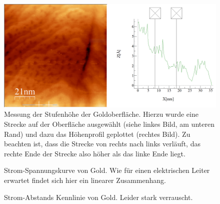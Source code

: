 \begin{figure}[H]
	\begin{center}
		\includegraphics[width=\linewidth]{Mess/gold_profil.png}
		\caption{Messung der Stufenhöhe der Goldoberfläche. Hierzu wurde eine Strecke auf der Oberfläche ausgewählt (siehe linkes Bild, am unteren Rand) und dazu das Höhenprofil geplottet (rechtes Bild). Zu beachten ist, dass die Strecke von rechts nach links verläuft, das rechte Ende der Strecke also höher als das linke Ende liegt.}
		\label{gold_profil}
	\end{center}
\end{figure}
	



\begin{figure}[H]
	\centering
	\caption{Strom-Spannungskurve von Gold. Wie für einen elektrischen Leiter erwartet findet sich hier ein linearer Zusammenhang.}
	\label{uigold}
\end{figure}



\begin{figure}[H]
	\centering
	\caption{Strom-Abstands Kennlinie von Gold. Leider stark verrauscht.}
	\label{uagold}
\end{figure}



